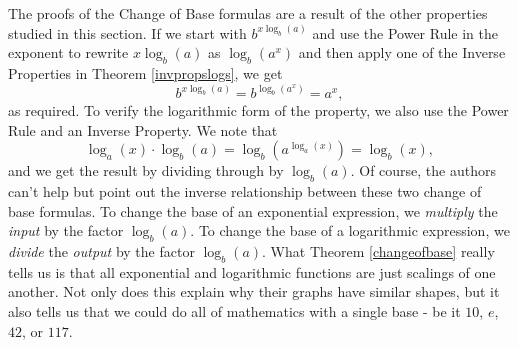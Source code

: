 \smallskip

The proofs of the Change of Base formulas are a result of the other properties studied in this section.  If we start with $b^{x \log_{b}(a)}$ and use the Power Rule in the exponent to rewrite $x \log_{b}(a)$ as $\log_{b}\left(a^{x}\right)$ and then apply one of the Inverse Properties in Theorem \ref{invpropslogs}, we get \[ b^{x \log_{b}(a)} = b^{\log_{b}\left(a^{x}\right)} = a^{x},\] as required.  To verify the logarithmic form of the property, we also use the Power Rule and an Inverse Property. We note that \[\log_{a}(x) \cdot \log_{b}(a) =  \log_{b} \left(a^{\log_{a}(x)}\right) = \log_{b}(x),\] and we get the result by dividing through by $\log_{b}(a)$.  Of course, the authors can't help but point out the inverse relationship between these two change of base formulas.  To change the base of an exponential expression, we \textit{multiply} the \textit{input} by the factor $\log_{b}(a)$.  To change the base of a logarithmic expression, we \textit{divide} the \textit{output} by the factor $\log_{b}(a)$.   What Theorem \ref{changeofbase} really tells us is that all exponential and logarithmic functions are just scalings of one another.  Not only does this explain why their graphs have similar shapes, but it also tells us that we could do all of mathematics with a single base - be it $10$, $e$, $42$, or $117$. 


\medskip

